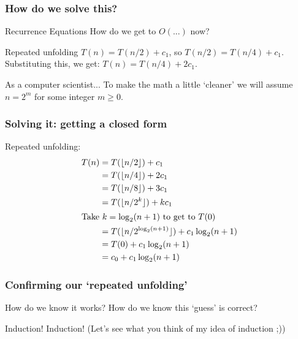 \begin{frame}
	\frametitle{How do we solve this?}

	\begin{block}{Recurrence Equations}
		How do we get to $O(...)$ now?
	\end{block}
	\pause
	\begin{block}{Repeated unfolding}
		$T(n) = T(n/2) +c_1$, so $T(n/2) = T(n/4) + c_1$.\\
		Substituting this, we get: $T(n) = T(n/4) + 2c_1$.
	\end{block}
	\pause
	\begin{block}{As a computer scientist...}
		To make the math a little `cleaner' we will assume $n = 2^m$ for some integer $m \geq 0$.	
	\end{block}
\end{frame}

\begin{frame}
	\frametitle{Solving it: getting a closed form}

	Repeated unfolding:
	\begin{align*}
		T(n) &= T(\lfloor n/2 \rfloor) + c_1\\
				 &= T(\lfloor n/4 \rfloor) + 2c_1\\
				 &= T(\lfloor n/8 \rfloor) + 3c_1\\
				 &= T(\lfloor n/2^k \rfloor) + kc_1\\
		\intertext{Take $k= \log_2(n+1)$ to get to $T(0)$}
		     &= T(\lfloor n/2^{\log_2(n+1)} \rfloor) + c_1\log_2(n+1)\\
				 &= T(0) + c_1\log_2(n+1)\\
				 &= c_0 + c_1\log_2(n+1)
	\end{align*}
\end{frame}

\begin{frame}
	\frametitle{Confirming our `repeated unfolding'}
	\begin{block}{How do we know it works?}
		How do we know this `guess' is correct?	
	\end{block}
	\begin{block}{Induction!}
		Induction! (Let's see what you think of my idea of induction ;))
	\end{block}
\end{frame}

